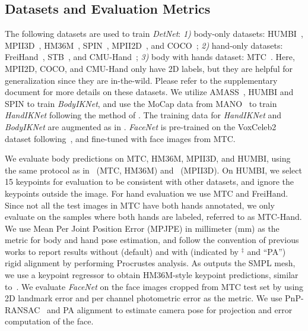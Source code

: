 \documentclass[final]{cvpr}
\begin{document}
\subsection{Datasets and Evaluation Metrics}
The following datasets are used to train \textit{DetNet}:
\textit{1)} body-only datasets: HUMBI~\cite{yu2020humbi}, MPII3D~\cite{mehta2017monocular}, HM36M~\cite{ionescu2013human3}, SPIN~\cite{kolotouros2019learning}, MPII2D~\cite{andriluka20142d}, and COCO~\cite{lin2014microsoft};
\textit{2)} hand-only datasets: FreiHand~\cite{zimmermann2019freihand}, STB~\cite{zhang2017a}, and CMU-Hand~\cite{simon2017hand};
\textit{3)} body with hands dataset: MTC~\cite{joo2018total}.
Here, MPII2D, COCO, and CMU-Hand only have 2D labels, but they are helpful for generalization since they are in-the-wild.
Please refer to the supplementary document for more details on these datasets.
We utilize AMASS~\cite{mahmood2019amass}, HUMBI and SPIN to train \textit{BodyIKNet}, and use the MoCap data from MANO~\cite{romero2017embodied} to train \textit{HandIKNet} following the method of \cite{zhou2020monocular}.
The training data for \textit{HandIKNet} and \textit{BodyIKNet} are augmented as in \cite{zhou2020monocular}.
\textit{FaceNet} is pre-trained on the VoxCeleb2~\cite{Chung18b} dataset following~\cite{tewari2017mofa}, and fine-tuned with face images from MTC.
\par
We evaluate body predictions on MTC, HM36M, MPII3D, and HUMBI, using the same protocol as in~\cite{xiang2019monocular} (MTC, HM36M) and~\cite{mehta2017vnect} (MPII3D).
On HUMBI, we select 15 keypoints for evaluation to be consistent with other datasets, and ignore the keypoints outside the image.
For hand evaluation we use MTC and FreiHand.
Since not all the test images in MTC have both hands annotated, we only evaluate on the samples where both hands are labeled, referred to as MTC-Hand.
We use Mean Per Joint Position Error (MPJPE) in millimeter (mm) as the metric for body and hand pose estimation, and follow the convention of previous works to report results without (default) and with (indicated by $^\ddagger$ and ``PA'') rigid alignment by performing Procrustes analysis.
As \cite{choutas2020monocular} outputs the SMPL mesh, we use a keypoint regressor to obtain HM36M-style keypoint predictions, similar to~\cite{kolotouros2019learning,kanazawa2018end}.
We evaluate \textit{FaceNet} on the face images cropped from MTC test set by using 2D landmark error and per channel photometric error as the metric.
We use PnP-RANSAC~\cite{fischler1981random} and PA alignment to estimate camera pose for projection and error computation of the face.
\end{document}
